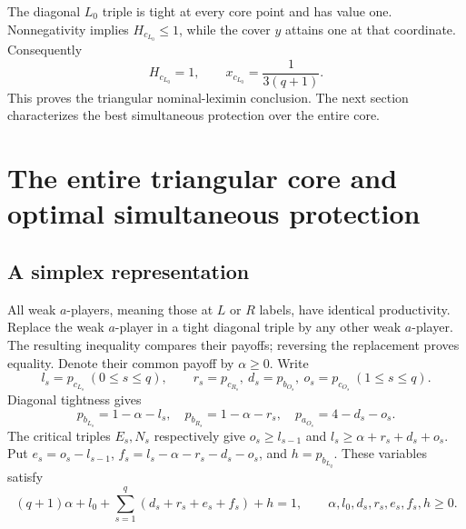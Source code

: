 \documentclass[11pt]{article}
\theoremstyle{remark}\newtheorem{remark}[theorem]{Remark}
\begin{document}
The diagonal $L_0$ triple is tight at every core point and has value one.
Nonnegativity implies $H_{c_{L_0}}\leq1$, while the cover $y$ attains
one at that coordinate. Consequently
\[
       H_{c_{L_0}}=1,\qquad x_{c_{L_0}}=\frac{1}{3(q+1)}.
\]
This proves the triangular nominal-leximin conclusion. The next section
characterizes the best simultaneous protection over the entire core.

\section{The entire triangular core and optimal simultaneous protection}
\subsection{A simplex representation}
All weak $a$-players, meaning those at $L$ or $R$ labels, have identical
productivity. Replace the weak $a$-player in a tight diagonal triple by any
other weak $a$-player. The resulting inequality compares their payoffs;
reversing the replacement proves equality. Denote their common payoff by
$\alpha\ge0$. Write
\[
 l_s=p_{c_{L_s}}\ (0\le s\le q),\qquad
 r_s=p_{c_{R_s}},\ d_s=p_{b_{O_s}},\ o_s=p_{c_{O_s}}\ (1\le s\le q).
\]
Diagonal tightness gives
\[
 p_{b_{L_s}}=1-\alpha-l_s,\quad p_{b_{R_s}}=1-\alpha-r_s,\quad
 p_{a_{O_s}}=4-d_s-o_s.
\]
The critical triples $E_s,N_s$ respectively give
$o_s\ge l_{s-1}$ and $l_s\ge\alpha+r_s+d_s+o_s$.
Put $e_s=o_s-l_{s-1}$, $f_s=l_s-\alpha-r_s-d_s-o_s$, and
$h=p_{b_{L_q}}$. These variables satisfy
\begin{equation}\label{eq:simplex}
 (q+1)\alpha+l_0+\sum_{s=1}^q(d_s+r_s+e_s+f_s)+h=1,
 \qquad \alpha,l_0,d_s,r_s,e_s,f_s,h\ge0.
\end{equation}
\end{document}
